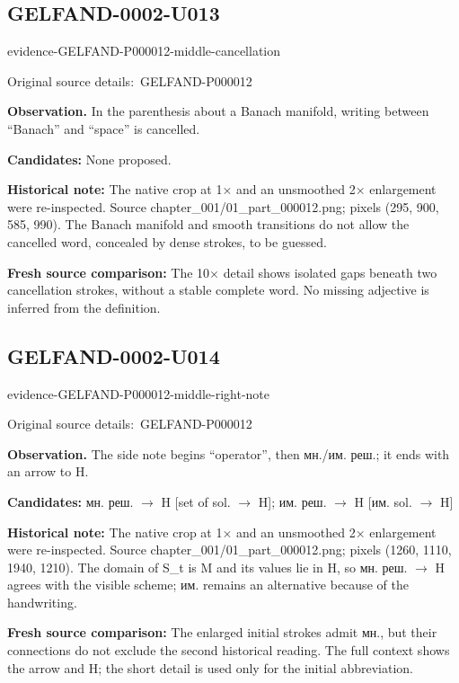 \documentclass[11pt]{article}
\newcommand{\EvidenceBlock}[4]{%
 \par\smallskip\noindent\begin{minipage}{\linewidth}
 \begin{minipage}[t]{.47\linewidth}\vspace{0pt}\centering
 \csname evidence-#1-#2\endcsname\par
 {\scriptsize\SourceCropCaption\ #1}\par
 \end{minipage}\hfill
 \begin{minipage}[t]{.49\linewidth}\vspace{0pt}\raggedright
 {\small\color{orange!65!black}\textbf{#4} #3}\par
 \end{minipage}
 \end{minipage}\par\smallskip}
\newcommand{\SourceCropCaption}{Original source details:}\newcommand{\ReadingCaption}{Uncertain reading.}\newcommand{\IncompleteCaption}{Undeciphered passage.}\newcommand{\DiagramCaption}{Diagram and typed description.}
\begin{document}
\subsection*{GELFAND-0002-U013}
\EvidenceBlock{GELFAND-P000012}{middle-cancellation}{In the parenthesis about a Banach manifold, writing between “Banach” and “space” is cancelled.}{Observation.}
\par\smallskip\noindent\textbf{Candidates: } None proposed.\par
\par\smallskip\noindent\textbf{Historical note: } The native crop at 1× and an unsmoothed 2× enlargement were re-inspected. Source chapter\_001/01\_part\_000012.png; pixels (295, 900, 585, 990). The Banach manifold and smooth transitions do not allow the cancelled word, concealed by dense strokes, to be guessed.\par
\par\smallskip\noindent\textbf{Fresh source comparison: } The 10× detail shows isolated gaps beneath two cancellation strokes, without a stable complete word. No missing adjective is inferred from the definition.\par

\subsection*{GELFAND-0002-U014}
\EvidenceBlock{GELFAND-P000012}{middle-right-note}{The side note begins “operator”, then мн./им. реш.; it ends with an arrow to H.}{Observation.}
\par\smallskip\noindent\textbf{Candidates: } мн. реш. \(\to\) H [set of sol. \(\to\) H]; им. реш. \(\to\) H [им. sol. \(\to\) H]\par
\par\smallskip\noindent\textbf{Historical note: } The native crop at 1× and an unsmoothed 2× enlargement were re-inspected. Source chapter\_001/01\_part\_000012.png; pixels (1260, 1110, 1940, 1210). The domain of S\_t is M and its values lie in H, so мн. реш. \(\to\) H agrees with the visible scheme; им. remains an alternative because of the handwriting.\par
\par\smallskip\noindent\textbf{Fresh source comparison: } The enlarged initial strokes admit мн., but their connections do not exclude the second historical reading. The full context shows the arrow and H; the short detail is used only for the initial abbreviation.\par
\end{document}
